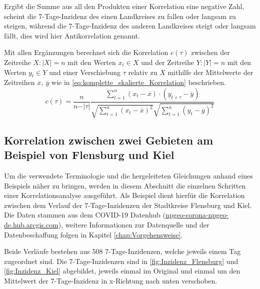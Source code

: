 Ergibt die Summe aus all den Produkten einer Korrelation eine negative Zahl, scheint die 7-Tage-Inzidenz des einen Landkreises zu fallen oder langsam zu steigen, während die 7-Tage-Inzidenz des anderen Landkreises steigt oder langsam fällt, dies wird hier Antikorrelation genannt.

Mit allen Ergänzungen berechnet sich die Korrelation $c(\tau)$ zwischen der Zeitreihe $X:|X|=n$ mit den Werten $x_t\in X$ und der Zeitreihe $Y:|Y|=n$ mit den Werten $y_t \in Y$ und einer Verschiebung $\tau$ relativ zu $X$ mithilfe der Mittelwerte der Zeitreihen $\overline x,\ \overline y$ wie in \autoref{eq:komplette_skalierte_Korrelation} beschrieben.
\begin{equation}\label{eq:komplette_skalierte_Korrelation}
    c(\tau) =\frac{n}{n-\vert\tau\vert}
    \frac{\sum_{t=1}^n (x_t-\overline x)\cdot (y_{t+\tau}-\overline y)}{\sqrt{\sum_{t=1}^n (x_t-\overline x)^2}\sqrt{\sum_{t=1}^n (y_t-\overline y)^2}}
\end{equation}

\subsection{Korrelation zwischen zwei Gebieten am Beispiel von Flensburg und Kiel}
Um die verwendete Terminologie und die hergeleiteten Gleichungen anhand eines Beispiels näher zu bringen, werden in diesem Abschnitt die einzelnen Schritten einer Korrelationsanalyse ausgeführt. Als Beispiel dient hierfür die Korrelation zwischen dem Verlauf der 7-Tage-Inzidenzen der Stadtkreise Flensburg und Kiel. Die Daten stammen aus dem \glqq{}COVID-19 Datenhub\grqq{}
(\href{npgeo-corona-npgeo-de.hub.arcgis.com}{npgeo-corona-npgeo-de.hub.arcgis.com}), weitere Informationen zur Datenquelle und der Datenbeschaffung folgen in Kapitel \autoref{chap:Vorgehensweise}.

Beide Verläufe bestehen aus 508 7-Tage-Inzidenzen, welche jeweils einem Tag zugeordnet sind. Die 7-Tage-Inzidenzen sind in \autoref{fig:Inzidenz_Flensburg} und \autoref{fig:Inzidenz_Kiel} abgebildet, jeweils einmal im Original und einmal um den Mittelwert der 7-Tage-Inzidenz in x-Richtung nach unten verschoben.

